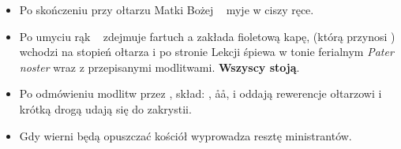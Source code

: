 \begin{itemize}
      \item Po skończeniu przy ołtarzu Matki Bożej \ii~ myje w ciszy ręce.
      \item Po umyciu rąk \ii~ zdejmuje fartuch a zakłada fioletową kapę, (którą
            przynosi ) wchodzi na stopień ołtarza i po stronie Lekcji śpiewa
            w tonie ferialnym \textit{Pater noster} wraz z przepisanymi
            modlitwami. \textbf{Wszyscy stoją}.
      \item Po odmówieniu modlitw przez \ii, skład: \ii, \aa\aa,  i  oddają
            rewerencje ołtarzowi i krótką drogą udają się do zakrystii.
      \item Gdy wierni będą opuszczać kościół  wyprowadza resztę
            ministrantów.
\end{itemize}
